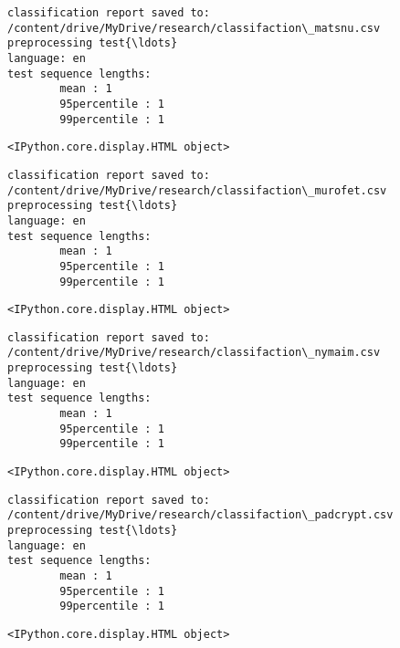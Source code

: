 \documentclass[11pt]{article}
\begin{document}
    
    \begin{Verbatim}[commandchars=\\\{\}]
classification report saved to:
/content/drive/MyDrive/research/classifaction\_matsnu.csv
preprocessing test{\ldots}
language: en
test sequence lengths:
        mean : 1
        95percentile : 1
        99percentile : 1
    \end{Verbatim}

    
    \begin{Verbatim}[commandchars=\\\{\}]
<IPython.core.display.HTML object>
    \end{Verbatim}

    
    \begin{Verbatim}[commandchars=\\\{\}]
classification report saved to:
/content/drive/MyDrive/research/classifaction\_murofet.csv
preprocessing test{\ldots}
language: en
test sequence lengths:
        mean : 1
        95percentile : 1
        99percentile : 1
    \end{Verbatim}

    
    \begin{Verbatim}[commandchars=\\\{\}]
<IPython.core.display.HTML object>
    \end{Verbatim}

    
    \begin{Verbatim}[commandchars=\\\{\}]
classification report saved to:
/content/drive/MyDrive/research/classifaction\_nymaim.csv
preprocessing test{\ldots}
language: en
test sequence lengths:
        mean : 1
        95percentile : 1
        99percentile : 1
    \end{Verbatim}

    
    \begin{Verbatim}[commandchars=\\\{\}]
<IPython.core.display.HTML object>
    \end{Verbatim}

    
    \begin{Verbatim}[commandchars=\\\{\}]
classification report saved to:
/content/drive/MyDrive/research/classifaction\_padcrypt.csv
preprocessing test{\ldots}
language: en
test sequence lengths:
        mean : 1
        95percentile : 1
        99percentile : 1
    \end{Verbatim}

    
    \begin{Verbatim}[commandchars=\\\{\}]
<IPython.core.display.HTML object>
    \end{Verbatim}
\end{document}
